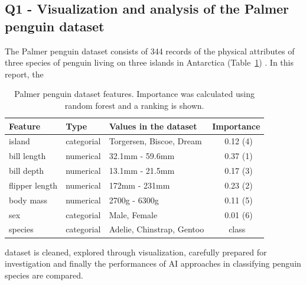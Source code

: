 \documentclass[a4paper, 11pt]{article}
\begin{document}
\begin{center}
  \subsection*{Q1 - Visualization and analysis of the Palmer penguin dataset}
\end{center}

\noindent
The Palmer penguin dataset consists of 344 records of the physical attributes of three species of penguin 
living on three islands in Antarctica (Table~\ref{tab:dataset}) \cite{PM}. In this
report, the
\begin{table} %
  \small
  \begin{center}
  \vspace{-1.7\baselineskip} %
  \setlength{\abovecaptionskip}{5pt}
  \setlength{\belowcaptionskip}{5pt}
  \fontsize{10}{10}\selectfont %
  \begin{tabular}{l|l|l|l}
  \textbf{Feature}&\textbf{Type}&\textbf{Values in the dataset}&\textbf{Importance}\\
  \hline
  island&categorial&Torgersen, Biscoe, Dream&\ \ \ 0.12 (4)\\
  bill length&numerical&32.1mm - 59.6mm&\ \ \ 0.37 (1)\\
  bill depth&numerical&13.1mm - 21.5mm&\ \ \ 0.17 (3)\\
  flipper length&numerical&172mm - 231mm&\ \ \ 0.23 (2)\\
  body mass&numerical&2700g - 6300g&\ \ \ 0.11 (5)\\
  sex&categorial&Male, Female&\ \ \ 0.01 (6)\\
  species&categorial&Adelie, Chinstrap, Gentoo&\ \ \ \ class\\
  \end{tabular}
  \vspace{-2\baselineskip} %
  \end{center} 
  \caption{\centering\linespread{0.8}\selectfont Palmer penguin dataset features. Importance was calculated using random forest and a ranking is shown.}
  \vspace{-2\baselineskip} %
  \label{tab:dataset}
\end{table}
dataset is cleaned, explored through visualization,  carefully prepared
for investigation and finally the performances of AI approaches in classifying penguin species are compared.
\end{document}
